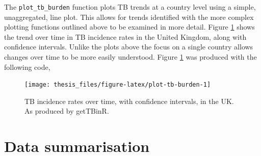 \documentclass[11pt,twoside]{bristolthesis}
\begin{document}
  The \texttt{plot\_tb\_burden} function plots TB trends at a country level using a simple, unaggregated, line plot. This allows for trends identified with the more complex plotting functions outlined above to be examined in more detail. Figure \ref{fig:plot-tb-burden} shows the trend over time in TB incidence rates in the United Kingdom, along with confidence intervals. Unlike the plots above the focus on a single country allows changes over time to be more easily understood. Figure \ref{fig:plot-tb-burden} was produced with the following code,
  \begin{Shaded}
  \begin{Highlighting}[]
  \NormalTok{(} \NormalTok{,}
                  \NormalTok{,}
                  \NormalTok{) }
  \end{Highlighting}
  \end{Shaded}
  \begin{figure}
  
  {\centering \texttt{[image: thesis\_files/figure-latex/plot-tb-burden-1]} 
  
  }
  
  \caption[TB incidence rates over time, with confidence intervals, in the UK. As produced by getTBinR.]{TB incidence rates over time, with confidence intervals, in the UK. As produced by getTBinR.}\label{fig:plot-tb-burden}
  \end{figure}
  \hypertarget{gettbinr-sum}{%
  \section{Data summarisation}\label{gettbinr-sum}}
  
\end{document}
